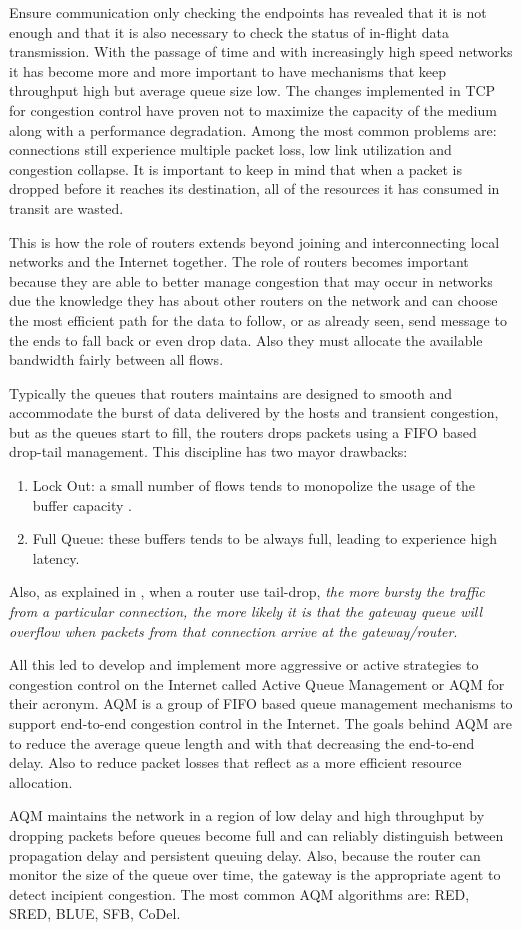 Ensure communication only checking the endpoints has revealed that it is not
enough and that it is also necessary to check the status of in-flight data
transmission. With the passage of time and with increasingly high speed
networks it has become more and more important to have mechanisms that keep
throughput high but average queue size low. The changes implemented in TCP for
congestion control have proven not to maximize the capacity of the medium
along with a performance degradation. Among the most common problems are:
connections still experience multiple packet loss, low link utilization and
congestion collapse. It is important to keep in mind that when a packet is
dropped before it reaches its destination, all of the resources it has
consumed in transit are wasted.

This is how the role of routers extends beyond joining and interconnecting local
networks and the Internet together. The role of routers becomes important
because they are able to better manage congestion that may occur in networks
due the knowledge they has about other routers on the network and can choose
the most efficient path for the data to follow, or as already seen, send
message to the ends to fall back or even drop data. Also they must allocate
the available bandwidth fairly between all flows.

Typically the queues that routers maintains are designed to smooth and
accommodate the burst of data delivered by the hosts and transient congestion,
but as the queues start to fill, the routers drops packets using a FIFO based
drop-tail management. This discipline has two mayor drawbacks:
\begin{enumerate}
\item Lock Out: a small number of flows tends to monopolize the usage of the
buffer capacity\cite{evolvshortlongflows} .
\item Full Queue: these buffers tends to be always full, leading to experience 
high latency.
\end{enumerate}

Also, as explained in \cite{FloydJacobsonRED}, when a router use tail-drop,
\textit{the more bursty the traffic from a particular connection, the more
likely it is that the gateway queue will overflow when packets from that
connection arrive at the gateway/router}.

All this led to develop and implement more aggressive or active strategies to
congestion control on the Internet called Active Queue Management or AQM for
their acronym. AQM is a group of FIFO based queue management mechanisms to
support end-to-end congestion control in the Internet. The goals behind AQM
are to reduce the average queue length and with that decreasing the end-to-end
delay. Also to reduce packet losses that reflect as a more efficient resource
allocation.

AQM maintains the network in a region of low delay and high throughput by
dropping packets before queues become full and can reliably distinguish
between propagation delay and persistent queuing delay. Also, because the
router can monitor the size of the queue over time, the gateway is the
appropriate agent to detect incipient congestion. The most common AQM
algorithms are: RED, SRED, BLUE, SFB, CoDel.
